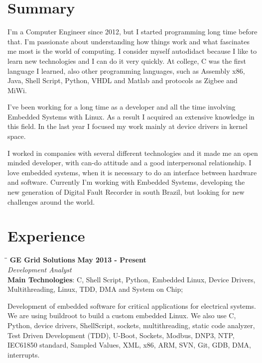 \documentclass[margin]{res}
\begin{document}
\address{São José, BR \\ diogojusten@gmail.com \\ Phone: +55 (48) 9 9994-4758 }

\begin{resume}

\section{Summary}
I'm a Computer Engineer since 2012, but I started programming long time before that. I’m passionate about understanding how things work and what fascinates me most is the world of computing. I consider myself autodidact because I like to learn new technologies and I can do it very quickly. At college, C was the first language I learned, also other programming languages, such as Assembly x86, Java, Shell Script, Python, VHDL and Matlab and protocols as Zigbee and MiWi.

I've been working for a long time as a developer and all the time involving Embedded Systems with Linux. As a result I acquired an extensive knowledge in this field. In the last year I focused my work mainly at device drivers in kernel space. 

I worked in companies with several different technologies and it made me an open minded developer, with can-do attitude and a good interpersonal relationship. I love embedded systems, when it is necessary to do an interface between hardware and software. Currently I’m working with Embedded Systems, developing the new generation of Digital Fault Recorder in south Brazil, but looking for new challenges around the world.

\section{Experience}
\vspace{-0.1in}
    \begin{tabbing}
    \hspace{2.3in}\= \hspace{1.7in}\= \kill %
    \textbf{GE Grid Solutions}    \>\>\textbf{May 2013 - Present}\\
    \textit{Development Analyst}\\
    \textbf{Main Technologies}: C, Shell Script, Python, Embedded Linux, Device Drivers,\\
                                Multithreading, Linux, TDD, DMA and System on Chip;
    \end{tabbing}\vspace{-20pt}      %
    \vspace{2mm}
Development of embedded software for critical applications for electrical systems. We are using buildroot to build a custom embedded Linux. We also use C, Python, device drivers, ShellScript, sockets, multithreading, static code analyzer, Test Driven Development (TDD), U-Boot, Sockets, Modbus, DNP3, NTP, IEC61850 standard, Sampled Values, XML, x86, ARM, SVN, Git, GDB, DMA, interrupts.


\end{resume}
\end{document}
